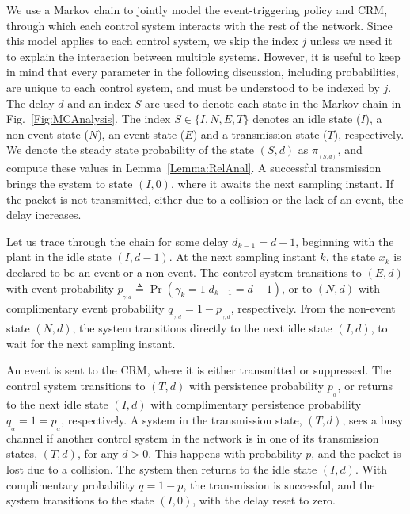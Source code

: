 \documentclass[twocolumn]{autart}
\begin{document}
We use a Markov chain to jointly model the event-triggering policy and CRM, through which each control system interacts with the rest of the network. Since this model applies to each control system, we skip the index $j$ unless we need it to explain the interaction between multiple systems. However, it is useful to keep in mind that every parameter in the following discussion, including probabilities, are unique to each control system, and must be understood to be indexed by $j$. The delay $d$ and an index $S$ are used to denote each state in the Markov chain in Fig.~\ref{Fig:MCAnalysis}. The index $S \in \{I,N,E,T\}$ denotes an idle state ($I$), a non-event state ($N$), an event-state ($E$) and a transmission state ($T$), respectively. We denote the steady state probability of the state $(S,d)$ as $\pi_{_{(S,d)}}$, and compute these values in Lemma~\ref{Lemma:RelAnal}. A successful transmission brings the system to state $(I,0)$, where it awaits the next sampling instant. If the packet is not transmitted, either due to a collision or the lack of an event, the delay increases.

Let us trace through the chain for some delay $d_{k-1}=d-1$, beginning with the plant in the idle state $(I,d-1)$. At the next sampling instant $k$, the state $x_k$ is declared to be an event or a non-event. The control system transitions to $(E,d)$ with event probability $p_{_{\gamma,d}} \triangleq \Pr(\gamma_k=1|d_{k-1}=d-1)$, or to $(N,d)$ with complimentary event probability $q_{_{\gamma,d}} = 1-p_{_{\gamma,d}}$, respectively. From the non-event state $(N,d)$, the system transitions directly to the next idle state $(I,d)$, to wait for the next sampling instant.

An event is sent to the CRM, where it is either transmitted or suppressed. The control system transitions to $(T,d)$ with persistence probability $p_{_{\alpha}}$, or returns to the next idle state $(I,d)$ with complimentary persistence probability $q_{_{\alpha}} = 1 = p_{_{\alpha}}$, respectively. A system in the transmission state, $(T,d)$, sees a busy channel if another control system in the network is in one of its transmission states, $(T,d)$, for any $d > 0$. This happens with probability $p$, and the packet is lost due to a collision. The system then returns to the idle state $(I,d)$. With complimentary probability $q=1-p$, the transmission is successful, and the system transitions to the state $(I,0)$, with the delay reset to zero.
\end{document}
